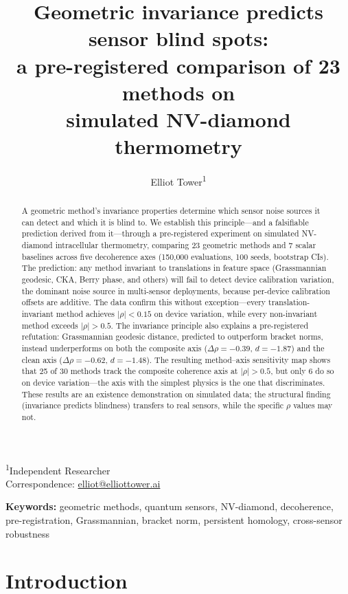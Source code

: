 \documentclass[11pt]{article}
\title{Geometric invariance predicts sensor blind spots:\\
  a pre-registered comparison of 23 methods on\\
  simulated NV-diamond thermometry}
\author{Elliot Tower\textsuperscript{1}}
\date{}
\begin{document}
\maketitle

\noindent\textsuperscript{1}Independent Researcher\\
\noindent Correspondence: \href{mailto:elliot@elliottower.ai}{elliot@elliottower.ai}

\bigskip

\begin{abstract}
A geometric method's invariance properties determine which sensor noise
sources it can detect and which it is blind to.  We establish this
principle---and a falsifiable prediction derived from it---through a
pre-registered experiment on simulated NV-diamond intracellular
thermometry, comparing 23 geometric methods and 7 scalar baselines
across five decoherence axes (150,000 evaluations, 100 seeds, bootstrap
CIs).  The prediction: any method invariant to translations in feature
space (Grassmannian geodesic, CKA, Berry phase, and others) will fail
to detect device calibration variation, the dominant noise source in
multi-sensor deployments, because per-device calibration offsets are
additive.  The data confirm this without exception---every
translation-invariant method achieves $|\rho| < 0.15$ on device
variation, while every non-invariant method exceeds $|\rho| > 0.5$.
The invariance principle also explains a pre-registered refutation:
Grassmannian geodesic distance, predicted to outperform bracket norms,
instead underperforms on both the composite axis ($\Delta\rho = -0.39$,
$d = -1.87$) and the clean axis ($\Delta\rho = -0.62$, $d = -1.48$).
The resulting method--axis sensitivity map shows that 25 of 30 methods
track the composite coherence axis at $|\rho| > 0.5$, but only 6 do so
on device variation---the axis with the simplest physics is the one that
discriminates.  These results are an existence demonstration on
simulated data; the structural finding (invariance predicts blindness)
transfers to real sensors, while the specific $\rho$ values may not.
\end{abstract}

\noindent\textbf{Keywords:}
geometric methods, quantum sensors, NV-diamond, decoherence,
pre-registration, Grassmannian, bracket norm, persistent homology,
cross-sensor robustness

\section{Introduction}
\label{sec:intro}
\end{document}
